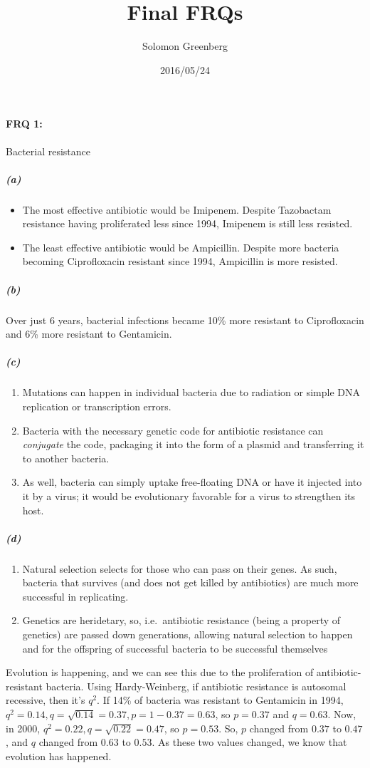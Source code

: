 \documentclass[12pt]{article}
\title{Final FRQs}
\date{2016/05/24}
\author{Solomon Greenberg}
\begin{document}
    \newpage
    \paragraph*{FRQ 1:} Bacterial resistance
        \subparagraph*{(a)}
            \begin{itemize}
                \item The most effective antibiotic would be Imipenem. Despite Tazobactam resistance having proliferated less since 1994, Imipenem is still less resisted.
                \item The least effective antibiotic would be Ampicillin. Despite more bacteria becoming Ciprofloxacin resistant since 1994, Ampicillin is more resisted.
            \end{itemize}
        \subparagraph*{(b)\\} Over just 6 years, bacterial infections became 10\% more resistant to Ciprofloxacin and 6\% more resistant to Gentamicin.
        \subparagraph*{(c)}
        \begin{enumerate}
                \item Mutations can happen in individual bacteria due to radiation or simple DNA replication or transcription errors.
                \item Bacteria with the necessary genetic code for antibiotic resistance can \textit{conjugate} the code, packaging it into the form of a plasmid and transferring it to another bacteria.
                \item As well, bacteria can simply uptake free-floating DNA or have it injected into it by a virus; it would be evolutionary favorable for a virus to strengthen its host.
        \end{enumerate}
        \subparagraph*{(d)}
        \begin{enumerate}
            \item Natural selection selects for those who can pass on their genes. As such, bacteria that survives (and does not get killed by antibiotics) are much more successful in replicating.
            \item Genetics are heridetary, so, i.e.\, antibiotic resistance (being a property of genetics) are passed down generations, allowing natural selection to happen and for the offspring of successful bacteria to be successful themselves
        \end{enumerate}
            Evolution is happening, and we can see this due to the proliferation of antibiotic-resistant bacteria. Using Hardy-Weinberg, if antibiotic resistance is autosomal recessive, then it's $q^2$. If 14\% of bacteria was resistant to Gentamicin in 1994, $q^2 = 0.14, q = \sqrt{0.14} = 0.37, p = 1 - 0.37 = 0.63$, so $p = 0.37$ and $q = 0.63$. Now, in 2000, $q^2 = 0.22, q = \sqrt{0.22} = 0.47$, so $p = 0.53$. So, $p$ changed from $0.37$ to $0.47$, and $q$ changed from $0.63$ to $0.53$. As these two values changed, we know that evolution has happened.
\end{document}
